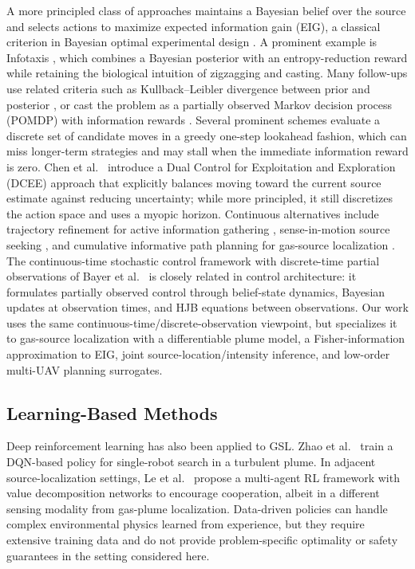 \documentclass{article}
\begin{document}
A more principled class of approaches maintains a Bayesian belief over the source and selects actions to maximize expected information gain (EIG), a classical criterion in Bayesian optimal experimental design \cite{lindley1956measurement,chaloner1995bayesian}.
A prominent example is Infotaxis \cite{vergassola2007infotaxis}, which combines a Bayesian posterior with an entropy-reduction reward while retaining the biological intuition of zigzagging and casting.
Many follow-ups use related criteria such as Kullback--Leibler divergence between prior and posterior \cite{hutchinson2019control}, or cast the problem as a partially observed Markov decision process (POMDP) with information rewards \cite{rahbar2019odorsource}.
Several prominent schemes evaluate a discrete set of candidate moves in a greedy one-step lookahead fashion, which can miss longer-term strategies and may stall when the immediate information reward is zero.
Chen et al.\ \cite{chen2021dcee} introduce a Dual Control for Exploitation and Exploration (DCEE) approach that explicitly balances moving toward the current source estimate against reducing uncertainty; while more principled, it still discretizes the action space and uses a myopic horizon.
Continuous alternatives include trajectory refinement for active information gathering \cite{charrow2015information}, sense-in-motion source seeking \cite{jin2024sense}, and cumulative informative path planning for gas-source localization \cite{jin2025cumulative}.
The continuous-time stochastic control framework with discrete-time partial observations of Bayer et al.~\cite{bayer2024continuous} is closely related in control architecture: it formulates partially observed control through belief-state dynamics, Bayesian updates at observation times, and HJB equations between observations.
Our work uses the same continuous-time/discrete-observation viewpoint, but specializes it to gas-source localization with a differentiable plume model, a Fisher-information approximation to EIG, joint source-location/intensity inference, and low-order multi-UAV planning surrogates.

\subsection{Learning-Based Methods}

Deep reinforcement learning has also been applied to GSL.
Zhao et al.\ \cite{zhao2022rl} train a DQN-based policy for single-robot search in a turbulent plume.
In adjacent source-localization settings, Le et al.\ \cite{le25multi_agent_rl} propose a multi-agent RL framework with value decomposition networks to encourage cooperation, albeit in a different sensing modality from gas-plume localization.
Data-driven policies can handle complex environmental physics learned from experience, but they require extensive training data and do not provide problem-specific optimality or safety guarantees in the setting considered here.
\end{document}

